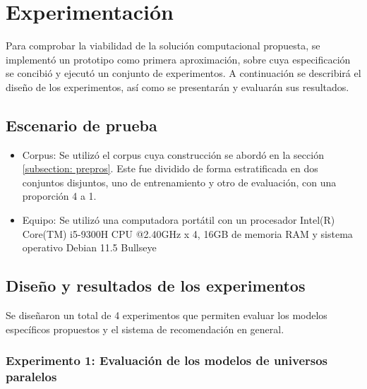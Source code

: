 \section{Experimentaci\'on}

Para comprobar la viabilidad de la soluci\'on computacional propuesta,
se implement\'o un prototipo como primera aproximaci\'on, sobre cuya
especificaci\'on se concibi\'o y ejecut\'o un conjunto de experimentos.
A continuaci\'on se describir\'a el dise\~no de los experimentos, as\'i
como se presentar\'an y evaluar\'an sus resultados.

\subsection{Escenario de prueba}


\begin{itemize}
    \item Corpus: Se utiliz\'o el corpus cuya construcci\'on se abord\'o en la
    secci\'on \ref{subsection: prepros}. Este fue dividido de forma estratificada en dos conjuntos disjuntos, uno de entrenamiento
    y otro de evaluaci\'on, con una proporci\'on 4 a 1.

    \item Equipo: Se utiliz\'o una computadora port\'atil con un procesador Intel(R) Core(TM) i5-9300H CPU @2.40GHz x 4, 16GB de memoria RAM y
    sistema operativo Debian 11.5 Bullseye
\end{itemize}

\subsection{Dise\~no y resultados de los experimentos}
    Se dise\~naron un total de 4 experimentos que permiten evaluar
    los modelos espec\'ificos propuestos y el sistema de recomendaci\'on en
    general.

    \subsubsection{Experimento 1: Evaluaci\'on de los modelos de universos paralelos}

